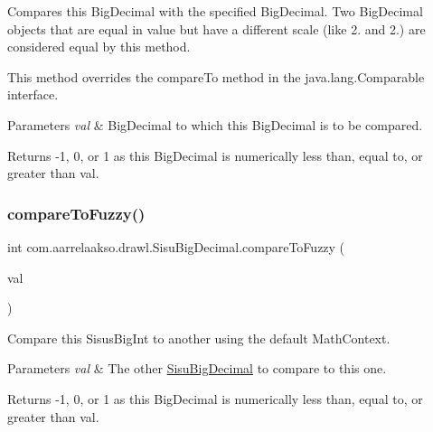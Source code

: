 Compares this Big\+Decimal with the specified Big\+Decimal. Two Big\+Decimal objects that are equal in value but have a different scale (like 2. and 2.) are considered equal by this method. 

This method overrides the compare\+To method in the java.\+lang.\+Comparable interface.


\begin{DoxyParams}{Parameters}
{\em val} & Big\+Decimal to which this Big\+Decimal is to be compared. \\
\hline
\end{DoxyParams}
\begin{DoxyReturn}{Returns}
-\/1, 0, or 1 as this Big\+Decimal is numerically less than, equal to, or greater than val. 
\end{DoxyReturn}
\mbox{\label{classcom_1_1aarrelaakso_1_1drawl_1_1_sisu_big_decimal_a9a7c6100961355b8acb1dbcb40197136}} 
\subsubsection{\texorpdfstring{compare\+To\+Fuzzy()}{compareToFuzzy()}\hspace{0.1cm}{\footnotesize\ttfamily [1/2]}}
{\footnotesize\ttfamily int com.\+aarrelaakso.\+drawl.\+Sisu\+Big\+Decimal.\+compare\+To\+Fuzzy (\begin{DoxyParamCaption}\item[{\hyperlink{classcom_1_1aarrelaakso_1_1drawl_1_1_sisu_big_decimal}{Sisu\+Big\+Decimal}}]{val }\end{DoxyParamCaption})\hspace{0.3cm}{\ttfamily [protected]}}

Compare this Sisus\+Big\+Int to another using the default Math\+Context.


\begin{DoxyParams}{Parameters}
{\em val} & The other \hyperlink{classcom_1_1aarrelaakso_1_1drawl_1_1_sisu_big_decimal}{Sisu\+Big\+Decimal} to compare to this one. \\
\hline
\end{DoxyParams}
\begin{DoxyReturn}{Returns}
-\/1, 0, or 1 as this Big\+Decimal is numerically less than, equal to, or greater than val. 
\end{DoxyReturn}
\mbox{\label{classcom_1_1aarrelaakso_1_1drawl_1_1_sisu_big_decimal_a2914bed4a69adb928d6edb2af9d578d4}} 
